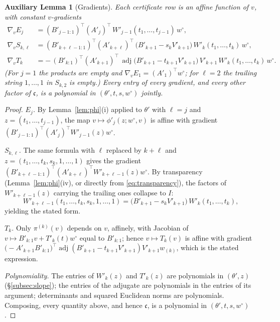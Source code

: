 \documentclass[11pt]{article}
\theoremstyle{definition}
\theoremstyle{remark}
\theoremstyle{plain}
\newtheorem{auxlemma}{Auxiliary Lemma}
\newcommand{\adj}{\operatorname{adj}}
\begin{document}
\begin{auxlemma}[Gradients]\label{lem:grad}
Each certificate row is an affine function of $v$, with constant $v$-gradients
\begin{align*}
\nabla_vE_j&=(B'_{j-1:1})^\top(A'_j)^\top\,W'_{j-1}(t_1,\dots,t_{j-1})\,w^\circ,\\
\nabla_vS_{k,\ell}&=(B'_{k+\ell-1:1})^\top(A'_{k+\ell})^\top\,
\big(B'_{k+1}-s_kV'_{k+1}\big)\,W'_k(t_1,\dots,t_k)\,w^\circ,\\
\nabla_vT_k&=-\,(B'_{k:1})^\top(A'_{k+1})^\top\,
\adj\!\big(B'_{k+1}-t_{k+1}V'_{k+1}\big)\,V'_{k+1}\,W'_k(t_1,\dots,t_k)\,w^\circ .
\end{align*}
\textup{(}For $j=1$ the products are empty and $\nabla_vE_1=(A'_1)^\top w^\circ$;
for $\ell=2$ the trailing string $1,\dots,1$ in $S_{k,2}$ is empty.\textup{)}  Every
entry of every gradient, and every other factor of $\mathfrak c$, is a polynomial in
$(\theta',t,s,w^\circ)$ jointly.
\end{auxlemma}

\begin{proof}
\emph{$E_j$.}  By Lemma~\ref{lem:phi}(i) applied to $\theta'$ with $\ell=j$ and
$z=(t_1,\dots,t_{j-1})$, the map $v\mapsto\phi'_j(z;w^\circ,v)$ is affine with
gradient $(B'_{j-1:1})^\top(A'_j)^\top W'_{j-1}(z)w^\circ$.

\emph{$S_{k,\ell}$.}  The same formula with $\ell$ replaced by $k+\ell$ and
$z=(t_1,\dots,t_k,s_k,1,\dots,1)$ gives the gradient
$(B'_{k+\ell-1:1})^\top(A'_{k+\ell})^\top W'_{k+\ell-1}(z)w^\circ$.  By transparency
(Lemma~\ref{lem:phi}(iv), or directly from \eqref{eq:transparency}), the factors
of $W'_{k+\ell-1}(z)$ carrying the trailing ones collapse to $I$:
\[
W'_{k+\ell-1}(t_1,\dots,t_k,s_k,1,\dots,1)
=\big(B'_{k+1}-s_kV'_{k+1}\big)\,W'_k(t_1,\dots,t_k),
\]
yielding the stated form.

\emph{$T_k$.}  Only $\pi^{(k)}(v)$ depends on $v$, affinely, with Jacobian of
$v\mapsto B'_{k:1}v+T'_k(t)w^\circ$ equal to $B'_{k:1}$; hence
$v\mapsto T_k(v)$ is affine with gradient
$\big(-A'_{k+1}B'_{k:1}\big)^\top\adj(B'_{k+1}-t_{k+1}V'_{k+1})V'_{k+1}w_{(k)}$, which
is the stated expression.

\emph{Polynomiality.}  The entries of $W'_k(z)$ and $T'_k(z)$ are polynomials in
$(\theta',z)$ (\S\ref{subsec:slope}); the entries of the adjugate are polynomials in
the entries of its argument; determinants and squared Euclidean norms are polynomials.
Composing, every quantity above, and hence $\mathfrak c$, is a polynomial in
$(\theta',t,s,w^\circ)$.
\end{proof}
\end{document}
